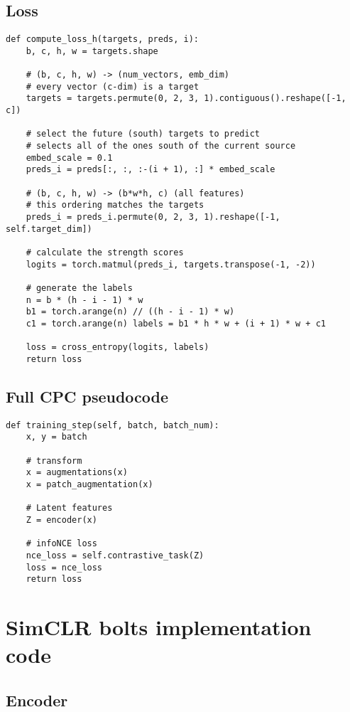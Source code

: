 \documentclass{article}
\begin{document}
\subsection{Loss}

\begin{lstlisting}
def compute_loss_h(targets, preds, i):
    b, c, h, w = targets.shape

    # (b, c, h, w) -> (num_vectors, emb_dim)
    # every vector (c-dim) is a target
    targets = targets.permute(0, 2, 3, 1).contiguous().reshape([-1, c])

    # select the future (south) targets to predict
    # selects all of the ones south of the current source
    embed_scale = 0.1
    preds_i = preds[:, :, :-(i + 1), :] * embed_scale

    # (b, c, h, w) -> (b*w*h, c) (all features)
    # this ordering matches the targets
    preds_i = preds_i.permute(0, 2, 3, 1).reshape([-1, self.target_dim])

    # calculate the strength scores
    logits = torch.matmul(preds_i, targets.transpose(-1, -2))

    # generate the labels
    n = b * (h - i - 1) * w
    b1 = torch.arange(n) // ((h - i - 1) * w)
    c1 = torch.arange(n) labels = b1 * h * w + (i + 1) * w + c1

    loss = cross_entropy(logits, labels)
    return loss
\end{lstlisting}

\subsection{Full CPC pseudocode}

\begin{lstlisting}
def training_step(self, batch, batch_num):
    x, y = batch
    
    # transform
    x = augmentations(x)
    x = patch_augmentation(x)

    # Latent features
    Z = encoder(x)

    # infoNCE loss
    nce_loss = self.contrastive_task(Z)
    loss = nce_loss
    return loss
\end{lstlisting}

\section{SimCLR bolts implementation code}\label{ap:simclr}

\subsection{Encoder}
\end{document}
